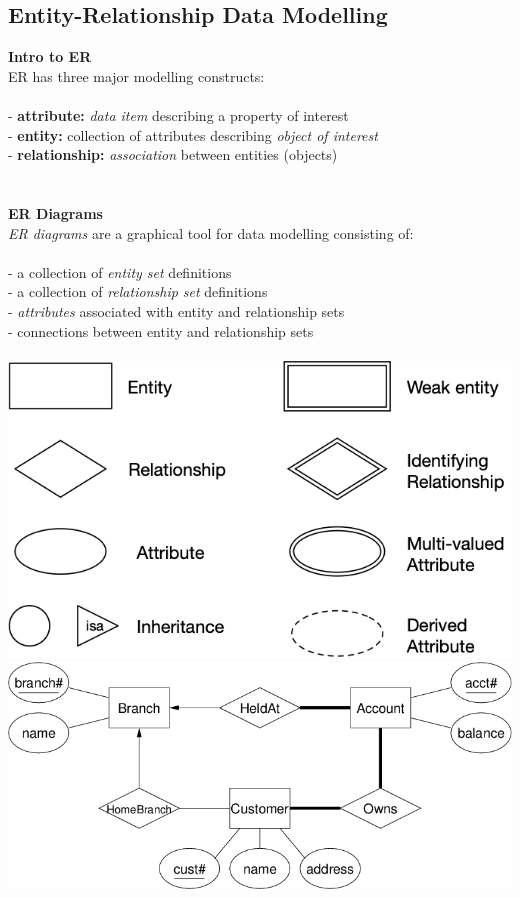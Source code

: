 \documentclass{article}
\begin{document}
\subsection{Entity-Relationship Data Modelling}
\textbf{Intro to ER} \\
ER has three major modelling constructs: \\\\
- \textbf{attribute:} \emph{data item} describing a property of interest \\
- \textbf{entity:} collection of attributes describing \emph{object of interest} \\
- \textbf{relationship:} \emph{association} between entities (objects) \\
\\\\
\textbf{ER Diagrams} \\
\emph{ER diagrams} are a graphical tool for data modelling consisting of:\\\\
- a collection of \emph{entity set} definitions \\
- a collection of \emph{relationship set} definitions \\
- \emph{attributes} associated with entity and relationship sets \\
- connections between entity and relationship sets \\\\
\includegraphics[scale=0.4]{ER_symbols} \\
\includegraphics[scale=0.4]{ER_example}
\end{document}
